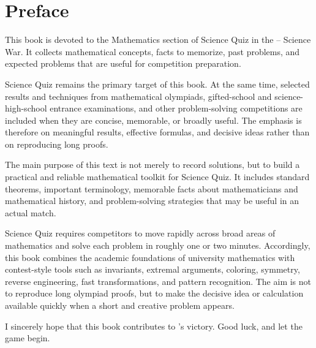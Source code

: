    \chapter*{Preface}

    This book is devoted to the Mathematics section of Science Quiz in the
    \POSTECH--\KAIST{} Science War.
    It collects mathematical concepts, facts to memorize, past problems, and
    expected problems that are useful for competition preparation.

    Science Quiz remains the primary target of this book. At the same time,
    selected results and techniques from mathematical olympiads, gifted-school
    and science-high-school entrance examinations, and other problem-solving
    competitions are included when they are concise, memorable, or broadly
    useful. The emphasis is therefore on meaningful results, effective formulas,
    and decisive ideas rather than on reproducing long proofs.

    The main purpose of this text is not merely to record solutions, but to
    build a practical and reliable mathematical toolkit for Science Quiz.
    It includes standard theorems, important terminology, memorable facts about
    mathematicians and mathematical history, and problem-solving strategies that
    may be useful in an actual match.

    Science Quiz requires competitors to move rapidly across broad areas of
    mathematics and solve each problem in roughly one or two minutes. Accordingly,
    this book combines the academic foundations of university mathematics with
    contest-style tools such as invariants, extremal arguments, coloring, symmetry,
    reverse engineering, fast transformations, and pattern recognition. The aim is
    not to reproduce long olympiad proofs, but to make the decisive idea or
    calculation available quickly when a short and creative problem appears.

    I sincerely hope that this book contributes to \POSTECH's victory.
    Good luck, and let the game begin.
